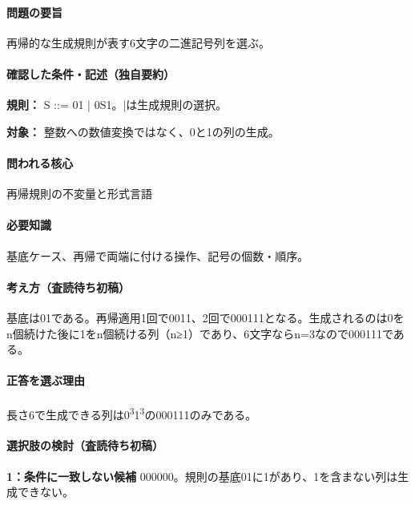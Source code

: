 \paragraph{問題の要旨} 再帰的な生成規則が表す6文字の二進記号列を選ぶ。

\paragraph{確認した条件・記述（独自要約）}\mbox{}\par

\noindent\textbf{規則：} S ::= 01 | 0S1。|は生成規則の選択。\par

\noindent\textbf{対象：} 整数への数値変換ではなく、0と1の列の生成。\par

\paragraph{問われる核心} 再帰規則の不変量と形式言語

\paragraph{必要知識} 基底ケース、再帰で両端に付ける操作、記号の個数・順序。

\paragraph{考え方（査読待ち初稿）} 基底は01である。再帰適用1回で0011、2回で000111となる。生成されるのは0をn個続けた後に1をn個続ける列（n≥1）であり、6文字ならn=\allowbreak{}3なので000111である。

\paragraph{正答を選ぶ理由} 長さ6で生成できる列は0\textsuperscript{3}1\textsuperscript{3}の000111のみである。

\paragraph{選択肢の検討（査読待ち初稿）}\mbox{}\par

\noindent\textbf{1：条件に一致しない候補} 000000。規則の基底01に1があり、1を含まない列は生成できない。\par

